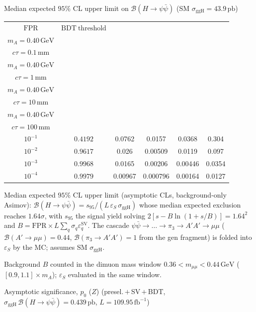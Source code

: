 \documentclass[10pt,a4paper]{article}
\begin{document}
{\vspace{12pt}

Median expected $95\%$ CL upper limit on $\mathcal{B}(H\to\psi\bar{\psi})$ (SM $\sigma_{\mathrm{ggH}}=43.9\,\mathrm{pb}$)

\begin{tabular}{cccccc}
\toprule
$\mathrm{FPR}$ & $\mathrm{BDT\ threshold}$ & \shortstack{$m_{\pi}=4\,\mathrm{GeV}$\\$m_{A}=0.40\,\mathrm{GeV}$\\$c\tau=0.1\,\mathrm{mm}$} & \shortstack{$m_{\pi}=4\,\mathrm{GeV}$\\$m_{A}=0.40\,\mathrm{GeV}$\\$c\tau=1\,\mathrm{mm}$} & \shortstack{$m_{\pi}=4\,\mathrm{GeV}$\\$m_{A}=0.40\,\mathrm{GeV}$\\$c\tau=10\,\mathrm{mm}$} & \shortstack{$m_{\pi}=4\,\mathrm{GeV}$\\$m_{A}=0.40\,\mathrm{GeV}$\\$c\tau=100\,\mathrm{mm}$} \\
\midrule
$10^{-1}$ & $0.4192$ & 0.0762 & 0.0157 & 0.0368 & 0.304\\
$10^{-2}$ & $0.9617$ & 0.026 & 0.00509 & 0.0119 & 0.097\\
$10^{-3}$ & $0.9968$ & 0.0165 & 0.00206 & 0.00446 & 0.0354\\
$10^{-4}$ & $0.9979$ & 0.00967 & 0.000796 & 0.00164 & 0.0127\\
\bottomrule
\end{tabular}

{\small Median expected $95\%$ CL upper limit (asymptotic CLs, background-only Asimov): $\mathcal{B}(H\to\psi\bar{\psi})=s_{95}/(L\,\varepsilon_S\,\sigma_{\mathrm{ggH}})$ whose median expected exclusion reaches $1.64\sigma$, with $s_{95}$ the signal yield solving $2[s-B\ln(1{+}s/B)]=1.64^2$ and $B=\mathrm{FPR}\times L\sum_q\sigma_q\varepsilon_q^{\mathrm{SV}}$. The cascade $\psi\bar{\psi}\to\ldots\to\pi_3\to A'A'\to\mu\mu$ ($\mathcal{B}(A'\to\mu\mu)=0.44$, $\mathcal{B}(\pi_3\to A'A')=1$ from the gen fragment) is folded into $\varepsilon_S$ by the MC; assumes SM $\sigma_{\mathrm{ggH}}$.}

{\small Background $B$ counted in the dimuon mass window $0.36<m_{\mu\mu}<0.44\,\mathrm{GeV}$ ($[0.9,1.1]\times m_A$); $\varepsilon_S$ evaluated in the same window.}

\vspace{12pt}

Asymptotic significance, $p_0$ ($Z$) (presel.\,$+$\,SV\,$+$\,BDT, $\sigma_{\mathrm{ggH}}\,\mathcal{B}(H\to\psi\bar{\psi})=0.439\,\mathrm{pb}$, $L=109.95\,\mathrm{fb}^{-1}$)

}
\end{document}
